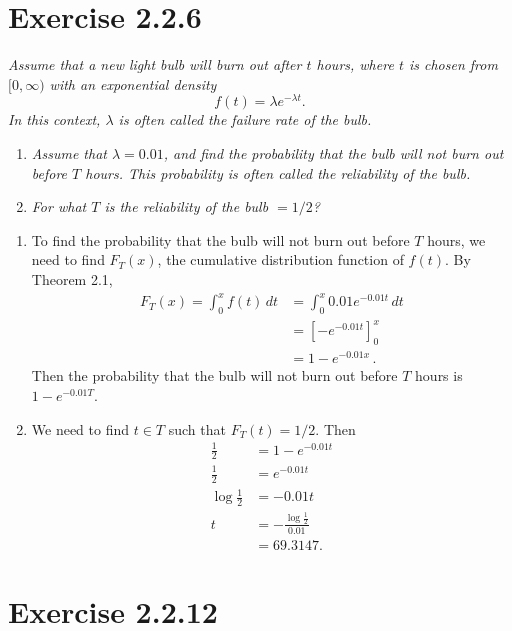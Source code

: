\documentclass{tufte-handout}
\begin{document}
\section{Exercise 2.2.6}

\emph{Assume that a new light bulb will burn out after $t$ hours,
  where $t$ is chosen from $[0,\infty)$ with an exponential density
  \[ f(t) = \lambda e^{-\lambda t}.\]
  In this context, $\lambda$ is often called the \emph{failure rate}
  of the bulb.}
\begin{enumerate}[label=\emph{(\alph*)}]
\item \emph{Assume that $\lambda = 0.01$, and find the probability
    that the bulb will \emph{not} burn out before $T$ hours. This
    probability is often called the \emph{reliability} of the bulb.}
\item \emph{For what $T$ is the reliability of the bulb
    $= 1/2$?}
\end{enumerate}

\bigskip

\begin{enumerate}[label=(\alph*)]
\item To find the probability that the bulb will not burn out
  before $T$ hours, we need to find $F_T(x)$, the cumulative distribution
  function of $f(t)$. By Theorem 2.1,
  \begin{align*}
    F_T(x) = \int_{0}^x \! f(t) \, dt &= \int_{0}^x \!
                                        0.01 e^{-0.01 t} \, dt \\
                                      &= \left[ -e^{-0.01t} \right]_0^x \\
                                      &= 1 - e^{-0.01x} \, .
  \end{align*}
  Then the probability that the bulb will not burn out before $T$
  hours is $1-e^{-0.01T}$.
\item We need to find $t \in T$ such that $F_T(t) = 1/2$. Then
  \begin{align*}
    \frac{1}{2} &= 1 - e^{-0.01t} \\
    \frac{1}{2} &= e^{-0.01t} \\
    \log{\frac{1}{2}} &= -0.01t \\
    t &= -\frac{\log{\frac{1}{2}}}{0.01} \\
                &= 69.3147.
  \end{align*}
\end{enumerate}

\section{Exercise 2.2.12}
\end{document}
